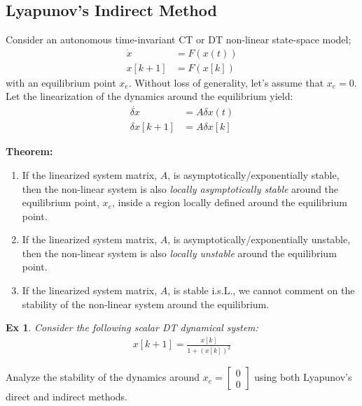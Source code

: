 \documentclass[twoside, 11pt]{article}
\newtheorem{exmp}[theorem]{Ex}
\begin{document}
\subsection{Lyapunov's Indirect Method}

Consider an autonomous time-invariant CT or DT non-linear state-space model;
%
\begin{align*}
    \dot{x} &= F(x(t)) \\
    x[k+1] &= F(x[k]) 
\end{align*}
%
with an equilibrium point $x_e$. Without loss of generality, let's assume that $x_e = 0$. Let the linearization of the dynamics around the equilibrium yield:
%
\begin{align*}
    \dot{\delta x} &= A \delta x(t) \\
    \delta x[k+1] &= A \delta x[k] 
\end{align*}
%

\textbf{Theorem:} 
\begin{enumerate}
    \item If the linearized system matrix, $A$, is asymptotically/exponentially stable, then the non-linear system
    is also \textit{locally asymptotically stable} around the equilibrium point, $x_e$, inside a region locally defined around the equilibrium point.
    \item If the linearized system matrix, $A$, is asymptotically/exponentially unstable, then the non-linear system
    is also \textit{locally unstable} around the equilibrium point.
    \item If the linearized system matrix, $A$, is stable i.s.L., we cannot comment on the stability of the non-linear system around the equilibrium.
\end{enumerate}

\begin{exmp}
    Consider the following scalar DT dynamical system:
    \begin{align*}
    x[k+1] = \frac{x[k]}{1 + (x[k])^2}
\end{align*}
\end{exmp}
Analyze the stability of the dynamics around $x_e = \begin{bmatrix} 0 \\ 0 \end{bmatrix}$ using both Lyapunov's direct and indirect methods.
\end{document}
